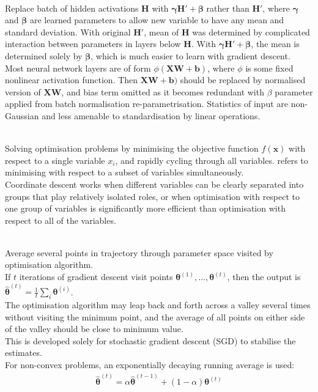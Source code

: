 \begin{remark} \\
Replace batch of hidden activations $\bm{H}$ with $\bm{\gamma} \bm{H}' + \bm{\beta}$ rather than $\bm{H}'$, where $\bm{\gamma}$ and $\bm{\beta}$ are learned parameters to allow new variable to have any mean and standard deviation. With original $\bm{H}'$, mean of $\bm{H}$ was determined by complicated interaction between parameters in layers below $\bm{H}$. With $\bm{\gamma} \bm{H}' + \bm{\beta}$, the mean is determined solely by $\bm{\beta}$, which is much easier to learn with gradient descent.\\
Most neural network layers are of form $\phi(\bm{X} \bm{W} + \bm{b})$, where $\phi$ is some fixed nonlinear activation function. Then $\bm{X} \bm{W} + \bm{b})$ should be replaced by normalised version of $\bm{X} \bm{W}$, and bias term omitted as it becomes redundant with $\beta$ parameter applied from batch normalisation re-parametrisation. Statistics of input are non-Gaussian and less amenable to standardisation by linear operations.	
\end{remark}

\begin{remark} \\
Solving optimisation problems by minimising the objective function $f(\bm{x})$ with respect to a single variable $x_i$, and rapidly cycling through all variables.  refers to minimising with respect to a subset of variables simultaneously.\\
 Coordinate descent works when different variables can be clearly separated into groups that play relatively isolated roles, or when optimisation with respect to one group of variables is significantly more efficient than optimisation with respect to all of the variables.
\end{remark}

\begin{remark} \\
Average several points in trajectory through parameter space visited by optimisation algorithm.\\
If $t$ iterations of gradient descent visit points $\bm{\theta}^{(1)}, \ldots, \bm{\theta}^{(t)}$, then the output is $\hat{\bm{\theta}}^{(t)} = \frac{1}{t} \sum_i \bm{\theta}^{(i)}$.\\
The optimisation algorithm may leap back and forth across a valley several times without visiting the minimum point, and the average of all points on either side of the valley should be close to minimum value.\\
This is developed solely for stochastic gradient descent (SGD) to stabilise the estimates.\\
For non-convex problems, an exponentially decaying running average is used:
\begin{align}
\hat{\bm{\theta}}^{(t)} = \alpha \hat{\bm{\theta}}^{(t-1)} + (1- \alpha)\bm{\theta}^{(t)} \nonumber
\end{align}
\end{remark}

